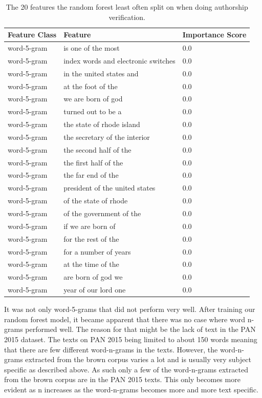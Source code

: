 \begin{table}
    \centering
    \begin{tabular}{lll}
        \textbf{Feature Class} & \textbf{Feature}     & \textbf{Importance Score} \\
        \hline
        word-5-gram & is one of the most & 0.0 \\
        word-5-gram & index words and electronic switches & 0.0 \\
        word-5-gram & in the united states and & 0.0 \\
        word-5-gram & at the foot of the & 0.0 \\
        word-5-gram & we are born of god & 0.0 \\
        word-5-gram & turned out to be a & 0.0 \\
        word-5-gram & the state of rhode island & 0.0 \\
        word-5-gram & the secretary of the interior & 0.0 \\
        word-5-gram & the second half of the & 0.0 \\
        word-5-gram & the first half of the & 0.0 \\
        word-5-gram & the far end of the & 0.0 \\
        word-5-gram & president of the united states & 0.0 \\
        word-5-gram & of the state of rhode & 0.0 \\
        word-5-gram & of the government of the & 0.0 \\
        word-5-gram & if we are born of & 0.0 \\
        word-5-gram & for the rest of the & 0.0 \\
        word-5-gram & for a number of years & 0.0 \\
        word-5-gram & at the time of the & 0.0 \\
        word-5-gram & are born of god we & 0.0 \\
        word-5-gram & year of our lord one & 0.0
    \end{tabular}
    \caption{The 20 features the random forest least often split on when doing
    authorship verification.}
    \label{tab:feature_non_importance}
\end{table}

It was not only word-5-grams that did not perform very well. After training
our random forest model, it became apparent that there was no case where word
n-grams performed well. The reason for that might be the lack of text in the PAN
2015 dataset. The texts on PAN 2015 being limited to about 150 words meaning
that there are few different word-n-grams in the texts. However, the
word-n-grams extracted from the brown corpus varies a lot and is usually very
subject specific as described above. As such only a few of the word-n-grams
extracted from the brown corpus are in the PAN 2015 texts. This only becomes
more evident as n increases as the word-n-grams becomes more and more text
specific.

